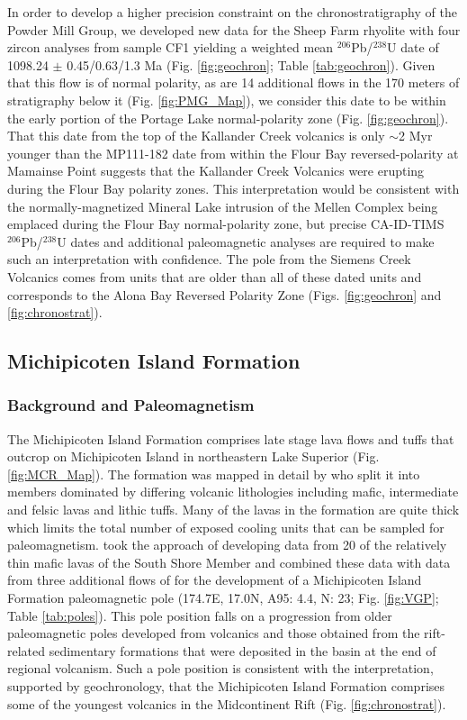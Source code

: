 \documentclass[11pt,letterpaper]{article}
\begin{document}
 In order to develop a higher precision constraint on the chronostratigraphy of the Powder Mill Group, we developed new data for the Sheep Farm rhyolite with four zircon analyses from sample CF1 yielding a weighted mean $^{206}$Pb/$^{238}$U date of 1098.24 $\pm$ 0.45/0.63/1.3 Ma (Fig. \ref{fig:geochron}; Table \ref{tab:geochron}). Given that this flow is of normal polarity, as are 14 additional flows in the 170 meters of stratigraphy below it (Fig. \ref{fig:PMG_Map}), we consider this date to be within the early portion of the Portage Lake normal-polarity zone (Fig. \ref{fig:geochron}). That this date from the top of the Kallander Creek volcanics is only $\sim$2 Myr younger than the MP111-182 date from within the Flour Bay reversed-polarity at Mamainse Point suggests that the Kallander Creek Volcanics were erupting during the Flour Bay polarity zones. This interpretation would be consistent with the normally-magnetized Mineral Lake intrusion of the Mellen Complex being emplaced during the Flour Bay normal-polarity zone, but precise CA-ID-TIMS $^{206}$Pb/$^{238}$U dates and additional paleomagnetic analyses are required to make such an interpretation with confidence. The pole from the Siemens Creek Volcanics comes from units that are older than all of these dated units and corresponds to the Alona Bay Reversed Polarity Zone (Figs. \ref{fig:geochron} and \ref{fig:chronostrat}).

\subsection{Michipicoten Island Formation}

\subsubsection{Background and Paleomagnetism}

The Michipicoten Island Formation comprises late stage lava flows and tuffs that outcrop on Michipicoten Island in northeastern Lake Superior (Fig. \ref{fig:MCR_Map}). The formation was mapped in detail by \cite{Annells1974a} who split it into members dominated by differing volcanic lithologies including mafic, intermediate and felsic lavas and lithic tuffs. Many of the lavas in the formation are quite thick which limits the total number of exposed cooling units that can be sampled for paleomagnetism. \cite{Fairchild2017a} took the approach of developing data from 20 of the relatively thin mafic lavas of the South Shore Member and combined these data with data from three additional flows of \citet{Palmer1987a} for the development of a Michipicoten Island Formation paleomagnetic pole (174.7\textdegree E, 17.0\textdegree N, A95: 4.4\textdegree, N: 23; Fig. \ref{fig:VGP}; Table \ref{tab:poles}). This pole position falls on a progression from older paleomagnetic poles developed from volcanics and those obtained from the rift-related sedimentary formations that were deposited in the basin at the end of regional volcanism. Such a pole position is consistent with the interpretation, supported by geochronology, that the Michipicoten Island Formation comprises some of the youngest volcanics in the Midcontinent Rift (Fig. \ref{fig:chronostrat}).
\end{document}
